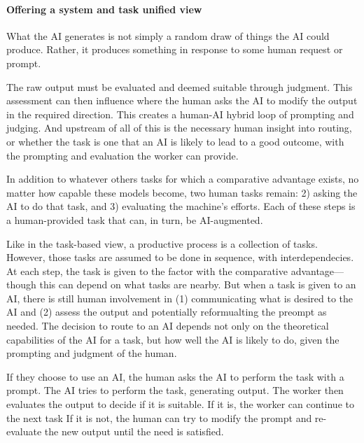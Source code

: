 \documentclass{article}
\begin{document}
\paragraph{Offering a system and task unified view}

What the AI generates is not simply a random draw of things the AI could produce.
Rather, it produces something in response to some human request or prompt.

The raw output must be evaluated and deemed suitable through judgment.
This assessment can then influence where the human asks the AI to modify the output in the required direction. 
This creates a human-AI hybrid loop of prompting and judging. 
And upstream of all of this is the necessary human insight into routing, or whether the task is one that an AI is likely to lead to a good outcome, with the prompting and evaluation the worker can provide. 

In addition to whatever others tasks for which a comparative advantage exists, no matter how capable these models become, two human tasks remain:
2) asking the AI to do that task, and 
3) evaluating the machine's efforts. 
Each of these steps is a human-provided task that can, in turn, be AI-augmented. 

Like in the task-based view, a productive process is a collection of tasks.
However, those tasks are assumed to be done in sequence, with interdependecies.
At each step, the task is given to the factor with the comparative advantage---though this can depend on what tasks are nearby.
But when a task is given to an AI, there is still human involvement in (1) communicating what is desired to the AI and (2) assess the output and potentially reformualting the preompt as needed.
The decision to route to an AI depends not only on the theoretical capabilities of the AI for a task, but how well the AI is likely to do, given the prompting and judgment of the human. 

If they choose to use an AI, the human asks the AI to perform the task with a prompt. 
The AI tries to perform the task, generating output.
The worker then evaluates the output to decide if it is suitable. 
If it is, the worker can continue to the next task 
If it is not, the human can try to modify the prompt and re-evaluate the new output until the need is satisfied. 
\end{document}

